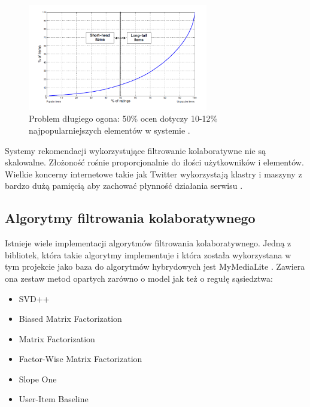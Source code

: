 \documentclass[twoside]{iisthesis}
\begin{document}
	  \begin{figure}[!ht] 
	  	\centering
	  	\includegraphics[width=0.7\textwidth]{longtail}
	  	\caption{Problem długiego ogona: 50\% ocen dotyczy 10-12\% najpopularniejszych elementów w systemie \protect\cite{id:RubensRecSysHB2010}.}
	  	\label{fig:longtail}
	  \end{figure}
	  
	  Systemy rekomendacji wykorzystujące filtrowanie kolaboratywne nie są skalowalne. Złożoność rośnie proporcjonalnie do ilości użytkowników i elementów. Wielkie koncerny internetowe takie jak Twitter wykorzystają klastry i maszyny z bardzo dużą pamięcią aby zachować płynność działania serwisu \cite{id:gupta2013wtf}.
	 
	 \subsection{Algorytmy filtrowania kolaboratywnego}
	 
	 Istnieje wiele implementacji algorytmów filtrowania kolaboratywnego. Jedną z bibliotek, która takie algorytmy implementuje i która została wykorzystana w tym projekcie jako baza do algorytmów hybrydowych jest MyMediaLite \cite{mymedialite,gantner2011mymedialite}. Zawiera ona zestaw metod opartych zarówno o model jak też o regułę sąsiedztwa:
	 
	 \begin{itemize}
	 	\item SVD++ \cite{koren2008factorization}
	 	\item Biased Matrix Factorization \cite{salakhutdinov2011probabilistic,rendle2008online}
	 	\item Matrix Factorization
	 	\item Factor-Wise Matrix Factorization \cite{bell2007modeling}
	 	\item Slope One \cite{lemire2005slope}
	 	\item User-Item Baseline \cite{koren2010factor}
	 \end{itemize}
	 
\end{document}

